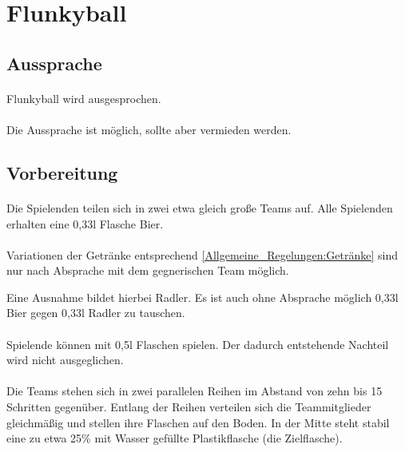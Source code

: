 \section{Flunkyball}
\subsection{Aussprache}
\paragraph{}
Flunkyball wird  ausgesprochen.

\paragraph{}
Die Aussprache  ist möglich, sollte aber vermieden werden.


\subsection{Vorbereitung}
\paragraph{}
Die Spielenden teilen sich in zwei etwa gleich große Teams auf.
Alle Spielenden erhalten eine 0,33l Flasche Bier.

\paragraph{}Variationen der Getränke entsprechend \ref{Allgemeine_Regelungen:Getränke} sind nur nach Absprache mit dem gegnerischen Team möglich.

Eine Ausnahme bildet hierbei Radler.
Es ist auch ohne Absprache möglich 0,33l Bier gegen 0,33l Radler zu tauschen.

\paragraph{}
Spielende können mit 0,5l Flaschen spielen. Der dadurch entstehende Nachteil wird nicht ausgeglichen.

\paragraph{}
Die Teams stehen sich in zwei parallelen Reihen im Abstand von zehn bis 15 Schritten gegenüber.
Entlang der Reihen verteilen sich die Teammitglieder gleichmäßig und stellen ihre Flaschen auf den Boden.
In der Mitte steht stabil eine zu etwa 25\% mit Wasser gefüllte Plastikflasche (die Zielflasche).

